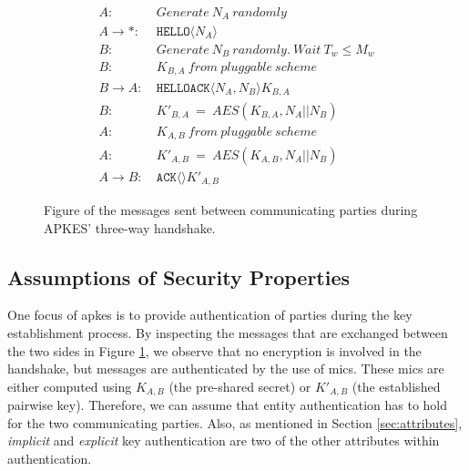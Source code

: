 \begin{figure}[h]
\begin{tcolorbox}[title=Three-way handshake in APKES]
\begin{align*}
A:\ & Generate\ N_A\ randomly\\
A \rightarrow *:\ & \texttt{HELLO}\langle{N_A}\rangle{}\\
B:\ & Generate\ N_B\ randomly.\ Wait\ T_w \leq M_w\\
B:\ & K_{B,A}\ from\ pluggable\ scheme\\
B \rightarrow A:\ & \texttt{HELLOACK}\langle{N_A, N_B}\rangle{K_{B,A}}\\
B:\ & K'_{B,A}\ =\ AES(K_{B,A}, N_A || N_B)\\
A:\ & K_{A,B}\ from\ pluggable\ scheme\\
A:\ & K'_{A,B}\ =\ AES(K_{A,B}, N_A || N_B)\\
A \rightarrow B:\ & \texttt{ACK}\langle{}\rangle{K'_{A,B}}
\end{align*}
\end{tcolorbox}
\caption{Figure of the messages sent between communicating parties during APKES' three-way handshake.}
\label{fig:apkes-handshake}
\end{figure}

\subsection{Assumptions of Security Properties}
\label{subsec:apkes-prop}

One focus of \gls{apkes} is to provide authentication of parties during the key establishment process. By inspecting the messages that are exchanged between the two sides in Figure \ref{fig:apkes-handshake}, we observe that no encryption is involved in the handshake, but messages are authenticated by the use of \gls{mic}s. These \gls{mic}s are either computed using $K_{A,B}$ (the pre-shared secret) or $K'_{A,B}$ (the established pairwise key). Therefore, we can assume that entity authentication has to hold for the two communicating parties. Also, as mentioned in Section \ref{sec:attributes}, \emph{implicit} and \emph{explicit} key authentication are two of the other attributes within authentication.


